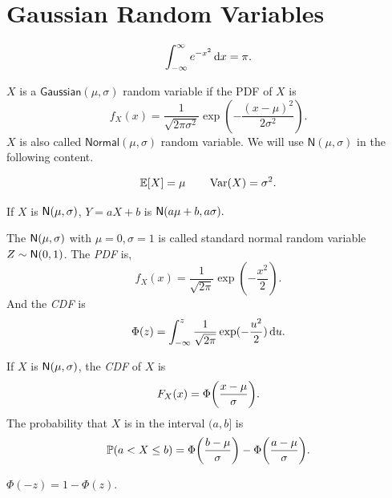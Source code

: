 \section{Gaussian Random Variables}
\begin{theorem}
    \[\int_{-\infty}^{\infty}e^{-x^2}\,\mathrm{d} x=\pi.\]
\end{theorem}

\begin{definition}
    $X$ is a $\mathsf{Gaussian}(\mu, \sigma)$ random variable if the \textrm{PDF} of $X$ is 
    \[f_X(x)=\frac{1}{\sqrt{2\pi\sigma^2}}\exp(-\frac{(x-\mu)^2}{2\sigma^2}).\]
    $X$ is also called $\mathsf{Normal}(\mu,\sigma)$ random variable. We will use $\mathsf{N}(\mu, \sigma)$ in the following content.
\end{definition}

\begin{theorem}
    \[\E{X} = \mu \qquad \Var(X) = \sigma^2.\]
\end{theorem}

\begin{theorem}
    If $X$ is $\mathsf{N}(\mu,\sigma)$, $Y=aX+b$ is $\mathsf{N}(a\mu+b,a\sigma).$
\end{theorem}

\begin{theorem}
    The $\mathsf{N}(\mu,\sigma)$ with $\mu=0, \sigma=1$ is called standard normal random variable $Z\sim\mathsf{N}(0,1)$. The \emph{PDF} is,
    \[f_X(x)=\frac{1}{\sqrt{2\pi}}\exp(-\frac{x^2}{2}).\]
    And the \emph{CDF} is 
    \[\Phi(z)=\int_{-\infty}^{z}\frac{1}{\sqrt{2\pi}}\exp(-\frac{u^2}{2})\,\mathrm{d} u.\]
\end{theorem}

\begin{theorem}
    If $X$ is $\mathsf{N}(\mu,\sigma)$, the \emph{CDF} of $X$ is 
    \[F_X(x)=\Phi\parens*{\frac{x-\mu}{\sigma}}.\]
    The probability that $X$ is in the interval \emph{$(a,b]$} is
    \[\P{a<X\leq b}=\Phi\parens*{\frac{b-\mu}{\sigma}}-\Phi\parens*{\frac{a-\mu}{\sigma}}.\]
\end{theorem}

\begin{theorem}
    $\Phi(-z)=1-\Phi(z).$
\end{theorem}


